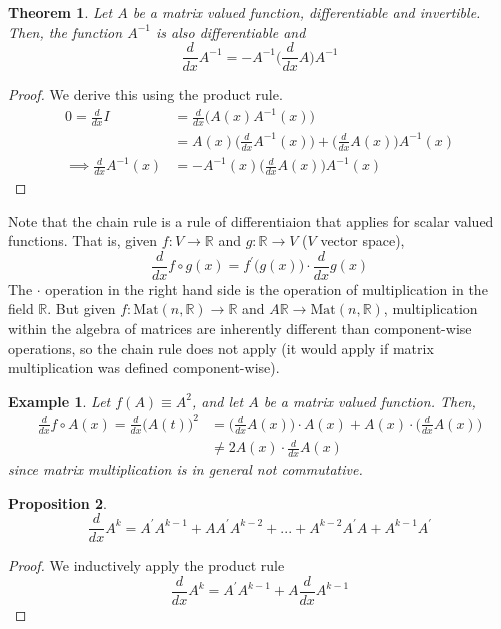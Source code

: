 \documentclass{article}
\newtheorem{theorem}{Theorem}[section]
\newtheorem{proposition}[theorem]{Proposition}
\newtheorem{example}{Example}[section]
\theoremstyle{remark}
\theoremstyle{definition}
\begin{document}
\begin{theorem}
Let $A$ be a matrix valued function, differentiable and invertible. Then, the function $A^{-1}$ is also differentiable and 
\[\frac{d}{d x} A^{-1} = - A^{-1} \bigg( \frac{d}{d x} A \bigg) A^{-1}\]
\end{theorem}
\begin{proof}
We derive this using the product rule. 
\begin{align*}
    0 = \frac{d}{d x} I & = \frac{d}{d x} \big( A(x) A^{-1} (x) \big) \\
    & = A(x) \bigg(\frac{d}{d x} A^{-1} (x) \bigg) + \bigg( \frac{d}{d x} A(x) \bigg) A^{-1} (x) \\
    \implies \frac{d}{d x} A^{-1} (x) & = - A^{-1} (x) \bigg( \frac{d}{d x} A(x) \bigg) A^{-1}(x)
\end{align*}
\end{proof}
Note that the chain rule is a rule of differentiaion that applies for scalar valued functions. That is, given $f: V \longrightarrow \mathbb{R}$ and $g: \mathbb{R} \longrightarrow V$ ($V$ vector space), 
\[\frac{d}{d x} f \circ g (x) = f^\prime \big( g(x) \big) \cdot \frac{d}{d x} g(x)\]
The $\cdot$ operation in the right hand side is the operation of multiplication in the field $\mathbb{R}$. But given $f: \text{Mat}(n, \mathbb{R}) \longrightarrow \mathbb{R}$ and $A \mathbb{R} \longrightarrow \text{Mat}(n, \mathbb{R})$, multiplication within the algebra of matrices are inherently different than component-wise operations, so the chain rule does not apply (it would apply if matrix multiplication was defined component-wise). 

\begin{example}
Let $f(A) \equiv A^2$, and let $A$ be a matrix valued function. Then, 
\begin{align*}
    \frac{d}{d x} f \circ A(x) = \frac{d}{d x} \big( A(t) \big)^2 & = \bigg( \frac{d}{d x} A(x) \bigg) \cdot A(x) + A(x) \cdot \bigg( \frac{d}{d x} A(x) \bigg) \\
    & \neq 2 A(x) \cdot \frac{d}{d x} A(x)
\end{align*}
since matrix multiplication is in general not commutative. 
\end{example}

\begin{proposition}
\[\frac{d}{d x} A^k = A^\prime A^{k-1} + A A^\prime A^{k-2} + ... + A^{k-2} A^\prime A + A^{k-1} A^\prime\]
\end{proposition}
\begin{proof}
We inductively apply the product rule
\[\frac{d}{d x} A^k = A^\prime A^{k-1} + A \frac{d}{d x} A^{k-1}\]
\end{proof}
\end{document}
